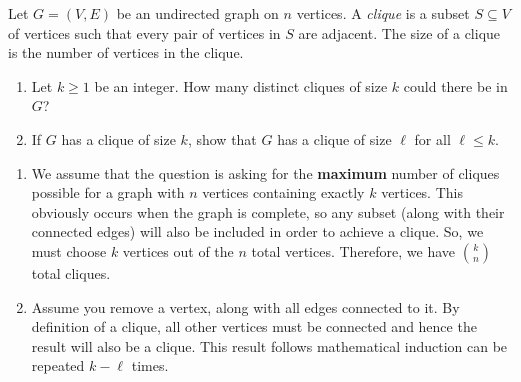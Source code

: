 \documentclass{article}
\begin{document}
\begin{question}
Let $G = (V, E)$ be an undirected graph on $n$ vertices. A {\em clique} is a subset $S \subseteq V$ of vertices such that every pair of vertices in $S$ are adjacent. The size of a clique is the number of vertices in the clique.

\begin{enumerate}[label = (\alph*)]
    \item Let $k \geq 1$ be an integer. How many distinct cliques of size $k$ could there be in $G$?

    \item If $G$ has a clique of size $k$, show that $G$ has a clique of size $\ell$ for all $\ell \leq k$.
\end{enumerate}
\end{question}

\begin{solution}
\begin{enumerate}[label = (\alph*)]
    \item We assume that the question is asking for the \textbf{maximum} number of cliques possible for a graph with $n$ vertices containing exactly $k$ vertices. This obviously occurs when the graph is complete, so any subset (along with their connected edges) will also be included in order to achieve a clique. So, we must choose $k$ vertices out of the $n$ total vertices. Therefore, we have $\displaystyle \binom{k}{n}$ total cliques.

    \item Assume you remove a vertex, along with all edges connected to it. By definition of a clique, all other vertices must be connected and hence the result will also be a clique. This result follows mathematical induction can be repeated $k-\ell$ times.
\end{enumerate}
\end{solution}
\end{document}
